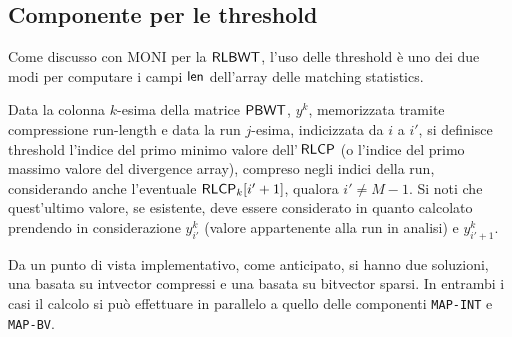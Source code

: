 \subsection{Componente per le threshold}
Come discusso con MONI per la $\mbox{\rm {\sf RLBWT}}$, l'uso delle threshold è 
uno dei due modi per computare i campi $\mbox{\rm {\sf len}}$ dell'array delle matching
statistics.  
\begin{definizione}
  Data la colonna $k$-esima della matrice $\mbox{\rm {\sf PBWT}}$, $y^k$, memorizzata
  tramite compressione run-length e data la run $j$-esima, indicizzata
  da $i$ a $i'$, si definisce threshold l'indice del primo minimo valore
  dell'$\,\mbox{\rm {\sf RLCP}}$ (o l'indice del primo massimo valore del divergence array),
  compreso negli indici della run, considerando anche l'eventuale 
  $\mbox{\rm {\sf RLCP}}_k[i'+1]$, qualora $i'\neq M-1$. Si noti che quest'ultimo valore, se
  esistente, deve essere considerato in quanto calcolato prendendo in
  considerazione $y^k_{i'}$ (valore appartenente alla run in analisi) e
  $y^k_{i'+1}$. 
\end{definizione}
Da un punto di vista implementativo, come anticipato, si hanno due soluzioni,
una basata su intvector compressi e una basata su bitvector sparsi. In
entrambi i casi il calcolo si può effettuare in parallelo a quello delle
componenti \texttt{MAP-INT} e \texttt{MAP-BV}.
